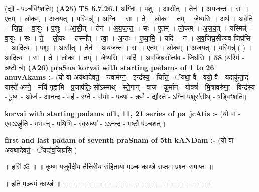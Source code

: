 \documentclass[17pt]{extarticle}
\begin{document}
                  \newline
                      (द्यौ - पञ्च॑विꣳशतिः)  \textbf{(A25)} \newline \newline
                                \textbf{ TS 5.7.26.1} \newline
                  अ॒ग्निः । प॒शुः । आ॒सी॒त् । तेन॑ । अ॒य॒ज॒न्त॒ । सः । ए॒तम् । लो॒कम् । अ॒ज॒य॒त् । यस्मिन्न्॑ । अ॒ग्निः । सः । ते॒ । लो॒कः । तम् । जे॒ष्य॒सि॒ । अथ॑ । अवेति॑ । जि॒घ्र॒ । वा॒युः । प॒शुः । आ॒सी॒त् । तेन॑ । अ॒य॒ज॒न्त॒ । सः । ए॒तम् । लो॒कम् । अ॒ज॒य॒त् । यस्मिन्न्॑ । वा॒युः । सः । ते॒ । लो॒कः । तस्मा᳚त् । त्वा॒ । अ॒न्तः । ए॒ष्या॒मि॒ । यदि॑ । न । अ॒व॒जिघ्र॒सीत्य॑व-जिघ्र॑सि । आ॒दि॒त्यः । प॒शुः । आ॒सी॒त् । तेन॑ । अ॒य॒ज॒न्त॒ । सः । ए॒तम् । लो॒कम् । अ॒ज॒य॒त् । यस्मिन्न्॑ ( ) । आ॒दि॒त्यः । सः । ते॒ । लो॒कः । तम् । जे॒ष्य॒सि॒ । यदि॑ । अ॒व॒जिघ्र॒सीत्य॑व - जिघ्र॑सि ॥ \textbf{  58 } \newline
                  \newline
                      (यस्मि॑ - न्न॒ष्टौ च॑)  \textbf{(A26)} \newline \newline
\textbf{praSna korvai with starting padams of 1 to 26 anuvAkams :-} \newline
(यो वा अय॑थादेवत॒ - न्त्वाम॑ग्न॒ - इन्द्र॑स्य॒ - चित्तिं॒ - ॅयथा॒ वै - वयो॒ वै - यदाकू॑ता॒द् - यास्ते॑ अग्ने॒ - मयि॑ गृह्णामि - प्र॒जाप॑तिः॒ सो᳚ऽस्माथ् - स्ते॒गान् - वाजं॑ - कू॒र्मान् - योक्त्रं॑ - मि॒त्रावरु॑णा॒ - विन्द्र॑स्य - पू॒ष्ण - ओज॑ - आन॒न्द - मह॑ - र॒ग्ने - र्वा॒योः - पन्थां॒ - क्रमै॒ - र्द्यौस्ते॒ - ऽग्निः प॒शुरा॑सी॒थ् - षड्विꣳ॑शतिः) \newline

\textbf{korvai with starting padams of1, 11, 21 series of pa~jcAtis :-} \newline
(यो वा - ए॒वाऽऽहु॑ति - मभवन् - प॒थिभि॑ - रव॒रुध्या॑ - ऽऽन॒न्द - म॒ष्टौ प॑ञ्च॒शत् ) \newline

\textbf{first and last padam of seventh praSnam of 5th kANDam :-} \newline
(यो वा अय॑थादेवतं॒ - ॅयद्य॑व॒जिघ्र॑सि ) \newline 


॥ हरिः॑ ॐ ॥
॥ कृष्ण यजुर्वेदीय तैत्तिरीय संहितायां पञ्चमकाण्डे सप्तमः प्रश्नः समाप्तः ॥

॥ इति पञ्चमं काण्डं ॥
=========================== \newline
\pagebreak
\pagebreak
        
\end{document}
